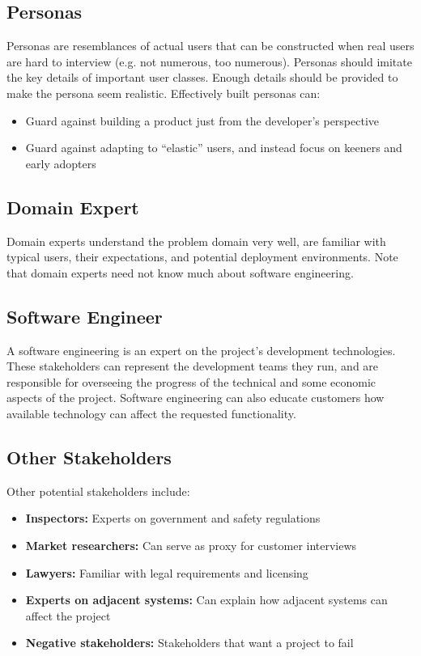 \documentclass[12pt,titlepage]{article}
\begin{document}
    \subsection{Personas}
      Personas are resemblances of actual users that can be constructed when real users are hard to interview (e.g. not numerous, too numerous). Personas
      should imitate the key details of important user classes. Enough details should be provided to make the persona seem realistic. Effectively built
      personas can:
      \begin{itemize}
        \item Guard against building a product just from the developer's perspective
        \item Guard against adapting to ``elastic'' users, and instead focus on keeners and early adopters
      \end{itemize}

    \subsection{Domain Expert}
      Domain experts understand the problem domain very well, are familiar with typical users, their expectations, and potential deployment environments.
      Note that domain experts need not know much about software engineering.

    \subsection{Software Engineer}
      A software engineering is an expert on the project's development technologies. These stakeholders can represent the development teams they run, and
      are responsible for overseeing the progress of the technical and some economic aspects of the project. Software engineering can also educate customers
      how available technology can affect the requested functionality.

    \subsection{Other Stakeholders}
      Other potential stakeholders include:
      \begin{itemize}
        \item \textbf{Inspectors:} Experts on government and safety regulations
        \item \textbf{Market researchers:} Can serve as proxy for customer interviews
        \item \textbf{Lawyers:} Familiar with legal requirements and licensing
        \item \textbf{Experts on adjacent systems:} Can explain how adjacent systems can affect the project
        \item \textbf{Negative stakeholders:} Stakeholders that want a project to fail
      \end{itemize}
\end{document}

